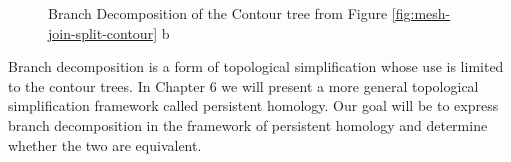 \begin{figure}%
    \centering
    \caption{Branch Decomposition of the Contour tree from Figure \ref{fig:mesh-join-split-contour} b}%
    \label{fig:branch-decomp}%
\end{figure}

Branch decomposition is a form of topological simplification whose use is limited to the contour trees. In Chapter 6 we will present a more general topological simplification framework called persistent homology. Our goal will be to express branch decomposition in the framework of persistent homology and determine whether the two are equivalent.


